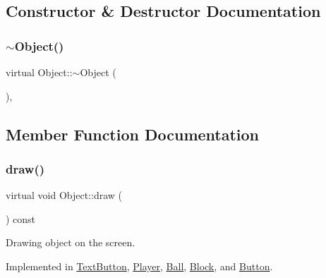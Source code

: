 \subsection{Constructor \& Destructor Documentation}
\mbox{\label{class_object_aa3e791419d84c4c346ef9499513b8e00}} 
\subsubsection{\texorpdfstring{$\sim$Object()}{~Object()}}
{\footnotesize\ttfamily virtual Object\+::$\sim$\+Object (\begin{DoxyParamCaption}{ }\end{DoxyParamCaption})\hspace{0.3cm}{\ttfamily [inline]}, {\ttfamily [virtual]}}



\subsection{Member Function Documentation}
\mbox{\label{class_object_af9862406dcd271bd45580737df468af4}} 
\subsubsection{\texorpdfstring{draw()}{draw()}}
{\footnotesize\ttfamily virtual void Object\+::draw (\begin{DoxyParamCaption}\item[{\mbox{\hyperlink{class_game_engine}{Game\+Engine}} $\ast$}]{ }\end{DoxyParamCaption}) const\hspace{0.3cm}{\ttfamily [pure virtual]}}



Drawing object on the screen. 



Implemented in \mbox{\hyperlink{class_text_button_a8af6b4a6e9084f157ffb015d29a02fcf}{Text\+Button}}, \mbox{\hyperlink{class_player_aaa0642fde01a4db5e9ee95693805ecda}{Player}}, \mbox{\hyperlink{class_ball_a278c50c66e8ea81f2178328022d742ff}{Ball}}, \mbox{\hyperlink{class_block_a3a41cfe615a31b5c4b824004d248ba65}{Block}}, and \mbox{\hyperlink{class_button_a99e75218b31357786cff815f87f1a093}{Button}}.

